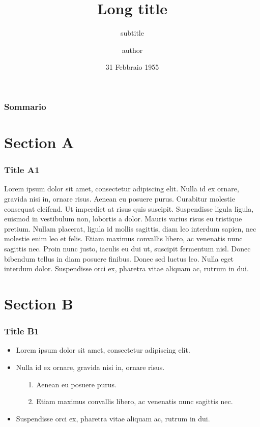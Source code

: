 \documentclass[c]{beamer}
\title[Short title]{Long title}
\subtitle{subtitle}
\author[author]{author}
\date[31/04/1995]{31 Febbraio 1955}
\begin{document}

\polimititlepage
\polimititlepage[polimi]
\polimititlepage[airlab]
\addtocounter{framenumber}{-3}


\begin{frame}
\frametitle{Sommario}
\tableofcontents
\end{frame}

\section{Section A}

\begin{frame}
\frametitle{Title A1}

Lorem ipsum dolor sit amet, consectetur adipiscing elit. Nulla id ex ornare, gravida nisi in, ornare risus. Aenean eu posuere purus. Curabitur molestie consequat eleifend. Ut imperdiet at risus quis suscipit. Suspendisse ligula ligula, euismod in vestibulum non, lobortis a dolor. Mauris varius risus eu tristique pretium. Nullam placerat, ligula id mollis sagittis, diam leo interdum sapien, nec molestie enim leo et felis. Etiam maximus convallis libero, ac venenatis nunc sagittis nec. Proin nunc justo, iaculis eu dui ut, suscipit fermentum nisl. Donec bibendum tellus in diam posuere finibus. Donec sed luctus leo. Nulla eget interdum dolor. Suspendisse orci ex, pharetra vitae aliquam ac, rutrum in dui.

\end{frame}

\section{Section B}

\begin{frame}
\frametitle{Title B1}

\begin{itemize}
\addtolength{\itemsep}{.2cm}
\item Lorem ipsum dolor sit amet, consectetur adipiscing elit.
\item Nulla id ex ornare, gravida nisi in, ornare risus.
  \begin{itemize}
    \addtolength{\itemsep}{.1cm}
  \item[1.] Aenean eu posuere purus.
  \item[2.] Etiam maximus convallis libero, ac venenatis nunc sagittis nec.
  \end{itemize}
\item Suspendisse orci ex, pharetra vitae aliquam ac, rutrum in dui.
\end{itemize}

\end{frame}
\end{document}
